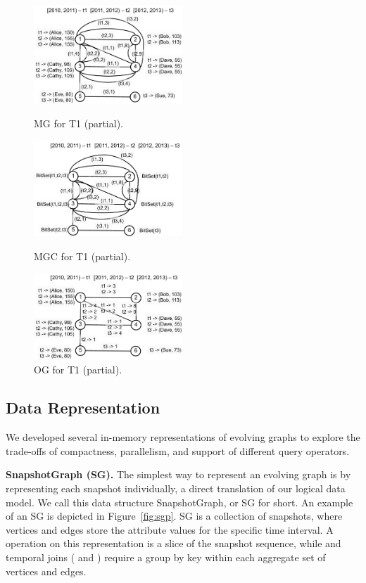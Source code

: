\begin{figure}[th!]
\begin{minipage}{2.3in}
\centering
\includegraphics[width=2.2in]{figs/mg.pdf}
\caption{MG for T1 (partial).}
\label{fig:mg}
\end{minipage}
\begin{minipage}{2.3in}
\centering
\includegraphics[width=2.2in]{figs/mgc.pdf}
\caption{MGC for T1 (partial).}
\label{fig:mgc}
\end{minipage}
\begin{minipage}{2.3in}
\centering
\includegraphics[width=2.2in]{figs/og.pdf}
\caption{OG for T1 (partial).}
\label{fig:og}
\end{minipage}
\end{figure}



\subsection{Data Representation}
\label{sec:sys:datastructs}

We developed several in-memory representations of evolving graphs to
explore the trade-offs of compactness, parallelism, and support of
different query operators.

{\bf SnapshotGraph (SG).} The simplest way to represent an evolving
graph is by representing each snapshot individually, a direct
translation of our logical data model.  We call this data structure
SnapshotGraph, or SG for short. An example of an SG is depicted in
Figure~\ref{fig:sgp}.  SG is a collection of snapshots, where vertices
and edges store the attribute values for the specific time interval.
A  operation on this representation is a slice of the
snapshot sequence, while  and temporal joins
( and ) require a group by key within each
aggregate set of vertices and edges.

